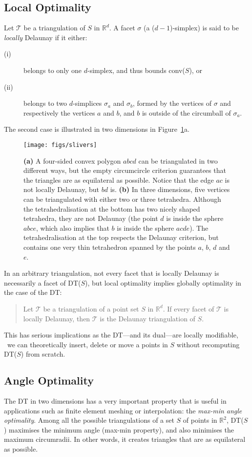 \subsection{Local Optimality}
Let $\mathcal{T}$ be a triangulation of $S$ in $\mathbb{R}^d$. 
A facet $\sigma$ 
(a ($d-1$)-simplex) is said to be \emph{locally} Delaunay if it either:
\begin{description}
  \item[(i)] belongs to only one $d$-simplex, and thus bounds conv($S$), or
  \item[(ii)] belongs to two $d$-simplices $\sigma_a$ and $\sigma_b$, formed by the vertices of $\sigma$ and respectively the vertices $a$ and $b$, and $b$ is outside of the circumball of $\sigma_a$.
\end{description}
The second case is illustrated in two dimensions in Figure~\ref{fig:slivers}a. 
\begin{figure}
  \centering
  \texttt{[image: figs/slivers]}
  \caption{\textbf{(a)} A four-sided convex polygon $abcd$ can be triangulated in two different ways, but the empty circumcircle criterion guarantees that the triangles are as equilateral as possible. Notice that the edge $ac$ is not locally Delaunay, but $bd$ is. \textbf{(b)} In three dimensions, five vertices can be triangulated with either two or three tetrahedra. Although the tetrahedralisation at the bottom has two nicely shaped tetrahedra, they are not Delaunay (the point $d$ is inside the sphere $abce$, which also implies that $b$ is inside the sphere $acde$). The tetrahedralisation at the top respects the Delaunay criterion, but contains one very thin tetrahedron spanned by the points $a$, $b$, $d$ and $e$.}%
\label{fig:slivers}
\end{figure}
In an arbitrary triangulation, not every facet that is locally Delaunay is necessarily a facet of DT($S$), but local optimality implies globally optimality in the case of the DT:
\begin{quote}
  Let $\mathcal{T}$ be a triangulation of a point set $S$ in $\mathbb{R}^d$. If every facet of $\mathcal{T}$ is locally Delaunay, then $\mathcal{T}$ is the Delaunay triangulation of $S$.
\end{quote}
This has serious implications as the DT---and its dual---are locally modifiable, \ie\ we can theoretically insert, delete or move a points in $S$ without recomputing DT($S$) from scratch.


\subsection{Angle Optimality}
The DT in two dimensions has a very important property that is useful in applications such as finite element meshing or interpolation: the \emph{max-min angle optimality}.
Among all the possible triangulations of a set $S$ of points in $\mathbb{R}^2$, DT($S$) maximises the minimum angle (max-min property), and also minimises the maximum circumradii. 
In other words, it creates triangles that are as equilateral as possible. 

